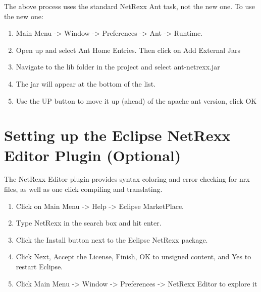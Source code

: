 The above process uses the standard NetRexx Ant task, not the new
one.  To use the new one:
\begin{enumerate}
\item Main Menu -> Window -> Preferences -> Ant -> Runtime.
\item Open up and select Ant Home Entries.  Then click on Add External
Jars
\item Navigate to the lib folder in the project and select
ant-netrexx.jar
\item The jar will appear at the bottom of the list.
\item Use the UP button to move it up (ahead) of the apache ant version,
click OK
\end{enumerate}

\section{Setting up the Eclipse NetRexx Editor Plugin (Optional)}
 
The NetRexx Editor plugin provides syntax coloring and error checking
for nrx files, as well as one click compiling and translating.

\begin{enumerate}
\item Click on Main Menu -> Help -> Eclipse MarketPlace.
\item Type NetRexx in the search box and hit enter.
\item Click the Install button next to the Eclipse NetRexx package.
\item Click Next, Accept the License, Finish, OK to unsigned content, and
Yes to restart Eclipse.
\item Click Main Menu -> Window -> Preferences -> NetRexx Editor to explore it
\end{enumerate}

